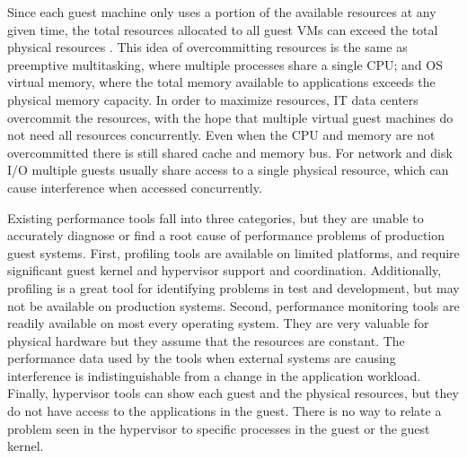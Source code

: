 Since each guest machine only uses a portion of the available resources at any given time, the total resources allocated to all guest VMs can exceed the total physical resources \cite{huber2, amit, buell1}.   This idea of overcommitting resources is the same as preemptive multitasking, where multiple processes share a single CPU; and OS virtual memory, where the total memory available to applications exceeds the physical memory capacity.  In order to maximize resources, IT data centers overcommit the resources, with the hope that multiple virtual guest machines do not need all resources concurrently.  Even when the CPU and memory are not overcommitted there is still shared cache and memory bus.  For network and disk I/O multiple guests usually share access to a single physical resource, which can cause interference when accessed concurrently.

Existing performance tools fall into three categories, but they are unable to accurately diagnose or find a root cause of performance problems of production guest systems.  First, profiling tools are available on limited platforms, and require significant guest kernel and hypervisor support and coordination.  Additionally, profiling is a great tool for identifying problems in test and development, but may not be available on production systems.  
Second, performance monitoring tools are readily available on most every operating system.  They are very valuable for physical hardware but they assume that the resources are constant.  The performance data used by the tools when external systems are causing interference is indistinguishable from a change in the application workload.
Finally, hypervisor tools can show each guest and the physical resources, but they do not have access to the applications in the guest.  There is no way to relate a problem seen in the hypervisor to specific processes in the guest or the guest kernel. 

